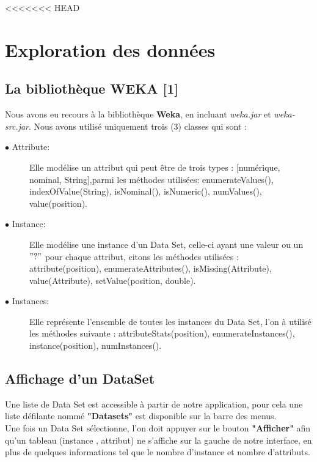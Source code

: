 \documentclass[12pt,a4paper,oneside]{book}
\begin{document}
	\def\reportnumber{}
	\def\reporttitle{Partie 1 : Exploration des données}
	
	
	
	\sffamily
<<<<<<< HEAD
	
	\setcounter{tocdepth}{2}
	\tableofcontents
	\newpage
	\listoffigures
	\newpage
	
	\chapter{Exploration des données}
	\section{La bibliothèque WEKA [1]}
	Nous avons eu recours à la bibliothèque \textbf{Weka}, en incluant \textit{weka.jar} et \textit{weka-src.jar}.
	Nous avons utilisé uniquement trois (3) classes qui sont :
	\begin{description}
		\item[$\bullet$ Attribute:] Elle modélise un attribut qui peut être de trois types : [numérique, nominal, String],parmi les méthodes utilisées: enumerateValues(), indexOfValue(String), isNominal(), isNumeric(), numValues(), value(position).
		
		\item[$\bullet$ Instance:] Elle modélise une instance d'un Data Set, celle-ci ayant une valeur ou un $"?"$ pour chaque attribut, citons les méthodes utilisées : attribute(position), enumerateAttributes(), isMissing(Attribute), value(Attribute), setValue(position, double).
		
		\item[$\bullet$ Instances:] Elle représente l'ensemble de toutes les instances du Data Set, l'on à utilisé les méthodes suivante : attributeStats(position), enumerateInstances(), instance(position), numInstances(). 
	\end{description}
	
	\section{Affichage d'un DataSet}
	Une liste de Data Set est accessible à partir de notre application, pour cela une liste défilante nommé \textbf{"Datasets"} est disponible sur la barre des menus.\\
	
	Une fois un Data Set sélectionne, l'on doit appuyer sur le bouton \textbf{"Afficher"} afin qu'un tableau (instance , attribut) ne s'affiche sur la gauche de notre interface, en plus de quelques informations tel que le nombre d'instance et nombre d'attributs.\\
	
\end{document}
